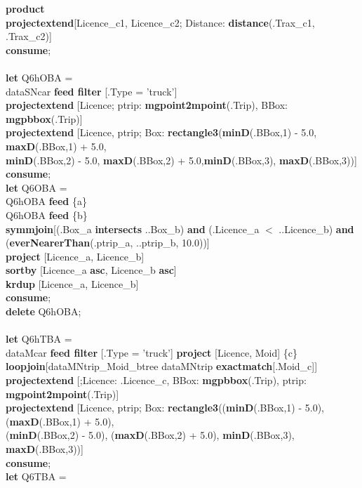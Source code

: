 \documentclass[a4paper]{article}
\newcommand{\op}[1]{\textbf{#1}}
\begin{document}
\begin{scriptsize}
\begin{tabbing}
\>\op{product}\\
\>\op{projectextend}[Licence\_c1, Licence\_c2; Distance: \op{distance}(.Trax\_c1, .Trax\_c2)]\\
\op{consume};\\
\\
\op{let} Q6hOBA =\\
\>dataSNcar \op{feed filter} [.Type = 'truck']\\
\>\op{projectextend} [Licence; ptrip: \op{mgpoint2mpoint}(.Trip), BBox: \op{mgpbbox}(.Trip)]\\
\>\op{projectextend} [Licence, ptrip; Box: \op{rectangle3}(\op{minD}(.BBox,1) - 5.0, \op{maxD}(.BBox,1) + 5.0,\\
\>\>\>\>\op{minD}(.BBox,2) - 5.0, \op{maxD}(.BBox,2) + 5.0,\op{minD}(.BBox,3), \op{maxD}(.BBox,3))]\\
\op{consume};\\
\op{let} Q6OBA =\\
\>Q6hOBA \op{feed} \{a\}\\
\>Q6hOBA \op{feed} \{b\}\\
\>\op{symmjoin}[(.Box\_a \op{intersects} ..Box\_b) \op{and} (.Licence\_a $<$
..Licence\_b) \op{and}\\
\>\>\>\>(\op{everNearerThan}(.ptrip\_a, ..ptrip\_b, 10.0))]\\
\>\op{project} [Licence\_a, Licence\_b]\\
\>\op{sortby} [Licence\_a \op{asc}, Licence\_b \op{asc}]\\
\>\op{krdup} [Licence\_a, Licence\_b]\\
\op{consume};\\
\op{delete} Q6hOBA;\\
\\
\op{let} Q6hTBA =\\
\>dataMcar \op{feed filter} [.Type = 'truck'] \op{project} [Licence, Moid]
\{c\}\\
\>\op{loopjoin}[dataMNtrip\_Moid\_btree dataMNtrip \op{exactmatch}[.Moid\_c]]\\
\>\op{projectextend} [;Licence: .Licence\_c, BBox: \op{mgpbbox}(.Trip), ptrip: \op{mgpoint2mpoint}(.Trip)]\\
\>\op{projectextend} [Licence, ptrip; Box: \op{rectangle3}((\op{minD}(.BBox,1) - 5.0), (\op{maxD}(.BBox,1) + 5.0),\\
\>\>\>\>(\op{minD}(.BBox,2) - 5.0), (\op{maxD}(.BBox,2) + 5.0), \op{minD}(.BBox,3), \op{maxD}(.BBox,3))]\\
\op{consume};\\
\op{let} Q6TBA =\\

\end{tabbing}
\end{scriptsize}
\end{document}
